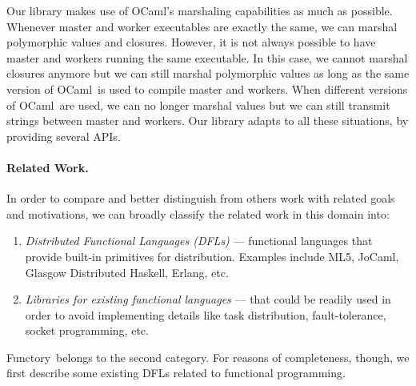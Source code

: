 \documentclass{llncs}
\newcommand{\Ocaml}{OCaml}
\newcommand{\functory}{\textsf{Functory}}
\begin{document}
Our library makes use of \Ocaml's marshaling capabilities as much as
possible. Whenever master and worker executables are exactly the same,
we can marshal polymorphic values and closures. However, it is not
always possible to have master and workers running the same
executable. In this case, we cannot marshal closures anymore but we
can still marshal polymorphic values as long as the same version of
\Ocaml\ is used to compile master and workers. When different versions
of \Ocaml\ are used, we can no longer marshal values but we can still
transmit strings between master and workers. Our library adapts to all
these situations, by providing several APIs.



\paragraph{Related Work.}
In order to compare and better distinguish
 from others work with related goals and motivations, we can
broadly classify the related work in this domain into:
\begin{enumerate}
\item \textit{Distributed Functional Languages (DFLs)} --- functional
  languages that provide built-in primitives for
  distribution. Examples include ML5, JoCaml, Glasgow Distributed
  Haskell, Erlang, etc.
\item \textit{Libraries for existing functional languages} --- that
  could be readily used in order to avoid implementing details like
  task distribution, fault-tolerance, socket programming, etc.
\end{enumerate}
\functory\ belongs to the second category.
For reasons of completeness, though, we first describe some existing DFLs
related to functional programming.
\end{document}

